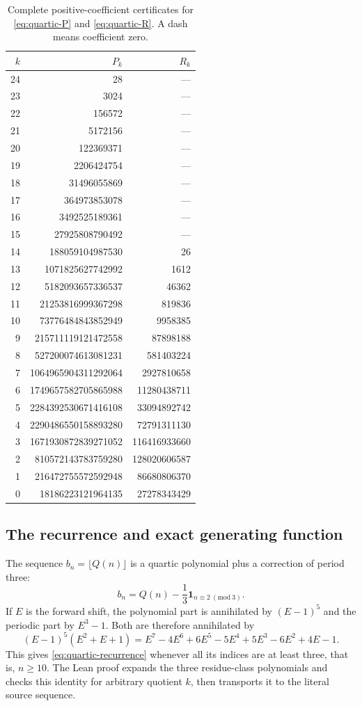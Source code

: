 \documentclass[11pt]{article}
\begin{document}
\begin{table}[p]
\centering
\small
\caption{Complete positive-coefficient certificates for
\eqref{eq:quartic-P} and \eqref{eq:quartic-R}. A dash means coefficient zero.}
\label{tab:quartic-cert}
\begin{tabular}{r|r|r}
$k$&$P_k$&$R_k$\\\hline
24&28&---\\
23&3024&---\\
22&156572&---\\
21&5172156&---\\
20&122369371&---\\
19&2206424754&---\\
18&31496055869&---\\
17&364973853078&---\\
16&3492525189361&---\\
15&27925808790492&---\\
14&188059104987530&26\\
13&1071825627742992&1612\\
12&5182093657336537&46362\\
11&21253816999367298&819836\\
10&73776484843852949&9958385\\
9&215711119121472558&87898188\\
8&527200074613081231&581403224\\
7&1064965904311292064&2927810658\\
6&1749657582705865988&11280438711\\
5&2284392530671416108&33094892742\\
4&2290486550158893280&72791311130\\
3&1671930872839271052&116416933660\\
2&810572143783759280&128020606587\\
1&216472755572592948&86680806370\\
0&18186223121964135&27278343429\\
\end{tabular}
\end{table}

\subsection{The recurrence and exact generating function}

The sequence $b_n=\lfloor Q(n)\rfloor$ is a quartic polynomial plus
a correction of period three:
\[
 b_n=Q(n)-\frac13\mathbf1_{n\equiv2\ (\mathrm{mod}\ 3)}.
\]
If $E$ is the forward shift, the polynomial part is annihilated by
$(E-1)^5$ and the periodic part by $E^3-1$. Both are therefore
annihilated by
\[
 (E-1)^5(E^2+E+1)
 =E^7-4E^6+6E^5-5E^4+5E^3-6E^2+4E-1.
\]
This gives \eqref{eq:quartic-recurrence} whenever all its indices are
at least three, that is, $n\ge10$. The Lean proof expands the three
residue-class polynomials and checks this identity for arbitrary
quotient $k$, then transports it to the literal source sequence.
\end{document}
